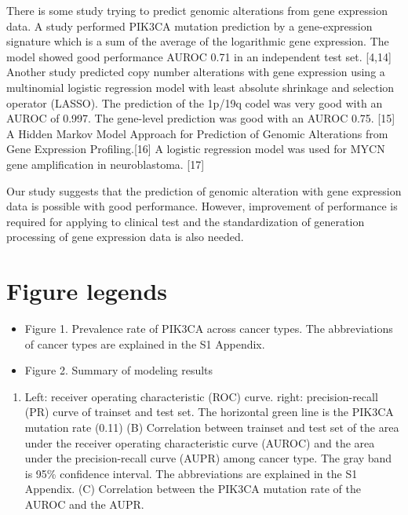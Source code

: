 \documentclass[10pt,letterpaper]{article}
\providecommand{\tightlist}{%
  \setlength{\itemsep}{0pt}\setlength{\parskip}{0pt}}
\begin{document}
There is some study trying to predict genomic alterations from gene
expression data. A study performed PIK3CA mutation prediction by a
gene-expression signature which is a sum of the average of the
logarithmic gene expression. The model showed good performance AUROC
0.71 in an independent test set. {[}4,14{]} Another study predicted copy
number alterations with gene expression using a multinomial logistic
regression model with least absolute shrinkage and selection operator
(LASSO). The prediction of the 1p/19q codel was very good with an AUROC
of 0.997. The gene-level prediction was good with an AUROC 0.75.
{[}15{]} A Hidden Markov Model Approach for Prediction of Genomic
Alterations from Gene Expression Profiling.{[}16{]} A logistic
regression model was used for MYCN gene amplification in neuroblastoma.
{[}17{]}

Our study suggests that the prediction of genomic alteration with gene
expression data is possible with good performance. However, improvement
of performance is required for applying to clinical test and the
standardization of generation processing of gene expression data is also
needed.

\hypertarget{figure-legends}{%
\section{Figure legends}\label{figure-legends}}

\begin{itemize}
\item
  Figure 1. Prevalence rate of PIK3CA across cancer types. The
  abbreviations of cancer types are explained in the S1 Appendix.
\item
  Figure 2. Summary of modeling results
\end{itemize}

\begin{enumerate}
\def\labelenumi{(\Alph{enumi})}
\tightlist
\item
  Left: receiver operating characteristic (ROC) curve. right:
  precision-recall (PR) curve of trainset and test set. The horizontal
  green line is the PIK3CA mutation rate (0.11) (B) Correlation between
  trainset and test set of the area under the receiver operating
  characteristic curve (AUROC) and the area under the precision-recall
  curve (AUPR) among cancer type. The gray band is 95\% confidence
  interval. The abbreviations are explained in the S1 Appendix. (C)
  Correlation between the PIK3CA mutation rate of the AUROC and the
  AUPR.
\end{enumerate}
\end{document}
